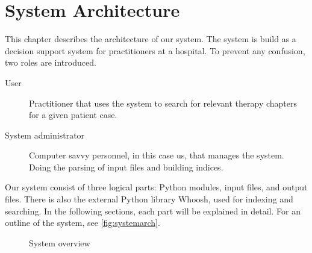 \chapter{System Architecture}
\label{cha:architecture}
This chapter describes the architecture of our system. The system is build as
a decision support system for practitioners at a hospital. To prevent any
confusion, two roles are introduced.
\begin{description}
	\item[User] Practitioner that uses the system to search for relevant
				therapy chapters for a given patient case.
	\item[System administrator] Computer savvy personnel, in this case us, that
				manages the system. Doing the parsing of input files and
				building indices.
\end{description}

Our system consist of three logical parts: Python modules, input files, and
output files. There is also the external Python library Whoosh, used for
indexing and searching. In the following sections, each part will be explained
in detail. For an outline of the system, see \autoref{fig:systemarch}.

\begin{figure}[tbp]
	\noindent{}
	\caption{System overview\label{fig:systemarch}}
\end{figure}



